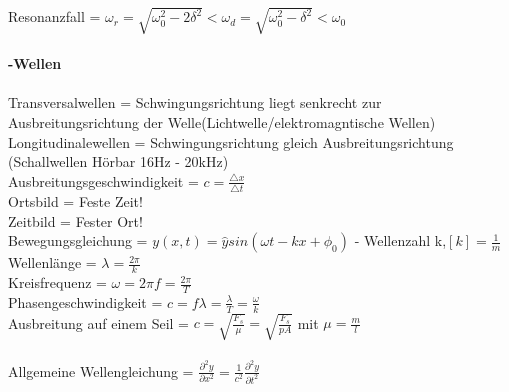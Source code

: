 \documentclass[8pt]{article}
\begin{document}
Resonanzfall = $\omega_r = \sqrt{\omega_0^2 -2\delta^2}<\omega_d=\sqrt{\omega_0^2-\delta^2}<\omega_0$ \\ \\
\noindent
{\large \textbf{-Wellen}}\\ \\
Transversalwellen = Schwingungsrichtung liegt senkrecht zur Ausbreitungsrichtung der Welle(Lichtwelle/elektromagntische Wellen)\\
Longitudinalewellen = Schwingungsrichtung gleich Ausbreitungsrichtung (Schallwellen Hörbar 16Hz - 20kHz)\\
Ausbreitungsgeschwindigkeit = $c=\frac{\bigtriangleup x}{\bigtriangleup t}$\\
Ortsbild = Feste Zeit! \\
Zeitbild = Fester Ort! \\
Bewegungsgleichung = $y(x,t) = \hat{y}sin(\omega t -kx + \phi_0)$ - 
Wellenzahl k,$[k] = \frac{1}{m}$\\
Wellenlänge = $\lambda = \frac{2\pi}{k}$\\
Kreisfrequenz = $\omega = 2\pi f = \frac{2\pi}{T}$ \\
Phasengeschwindigkeit = $c=f\lambda = \frac{\lambda}{T} = \frac{\omega}{k}$\\
Ausbreitung auf einem Seil = $c = \sqrt{\frac{F_s}{\mu}} = \sqrt{\frac{F_s}{pA}}$  mit $\mu =\frac{m}{l}$\\ \\
\noindent
Allgemeine Wellengleichung = $\frac{\partial^2y}{\partial x^2}=\frac{1}{c^2} \frac{\partial^2y}{\partial t^2}$
\end{document}
